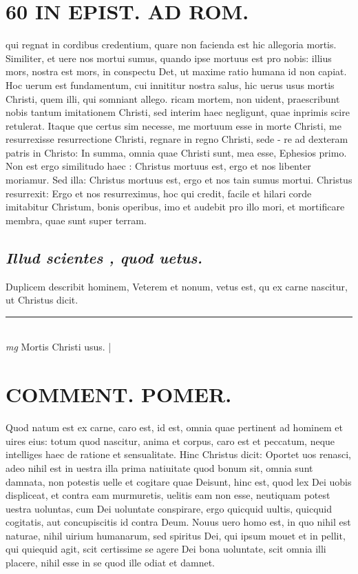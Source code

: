 \documentclass{article}
\begin{document}
\begin{pages}
\section*{60 IN EPIST. AD ROM.  }
\marginpar{[ p.]}\pstart qui regnat in cordibus credentium, quare non facienda est hic allegoria mortis. Similiter, et uere nos mortui sumus, quando ipse mortuus est pro nobis: illius mors, nostra est mors, in conspectu Det, ut maxime ratio humana id non capiat. Hoc uerum est fundamentum, cui innititur nostra salus, hic uerus usus mortis Christi, quem illi, qui somniant allego.  ricam mortem, non uident, praescribunt nobis tantum imitationem Christi, sed interim haec negligunt, quae inprimis scire retulerat. Itaque que certus sim necesse, me mortuum esse in morte Christi, me resurrexisse resurrectione Christi, regnare in regno Christi, sede - re ad dexteram patris in Christo: In summa, omnia quae Christi sunt, mea esse, Ephesios primo. Non est ergo similitudo haec : Christus mortuus est, ergo et nos libenter moriamur. Sed illa: Christus mortuus est, ergo et nos tain sumus mortui. Christus resurrexit: Ergo et nos resurreximus, hoc qui credit, facile et hilari corde imitabitur Christum, bonis operibus, imo et audebit pro illo mori, et mortificare membra, quae sunt super terram.   \pend
{}
{}
\subsection*{\textit{Illud scientes , quod uetus. }}\pstart Duplicem describit hominem, Veterem et nonum, vetus est, qu ex carne nascitur, ut Christus dicit.  \pend
\vspace{0.5cm}\noindent
\vspace{0.2cm}\rule{1cm}{0.2pt}\\ 
\hspace{0.2cm}\textit{mg}
\footnotesize Mortis Christi usus.  
\normalsize| 
\section*{COMMENT. POMER.  }\pstart Quod natum est ex carne, caro est, id est, omnia quae pertinent ad hominem et uires eius: totum quod nascitur, anima et corpus, caro est et peccatum, neque  intelliges haec de ratione et sensualitate. Hinc Christus dicit: Oportet uos renasci, adeo nihil est in uestra illa prima natiuitate quod bonum sit, omnia sunt damnata, non potestis uelle et cogitare quae Deisunt, hinc est, quod lex Dei uobis displiceat, et contra eam murmuretis, uelitis eam non esse, neutiquam potest uestra uoluntas, cum Dei uoluntate conspirare, ergo quicquid uultis, quicquid cogitatis, aut concupiscitis id contra Deum. Nouus uero homo est, in quo nihil est naturae, nihil uirium humanarum, sed spiritus Dei, qui ipsum mouet et in pellit, qui quiequid agit, scit certissime se agere Dei bona uoluntate, scit omnia illi placere, nihil esse in se quod ille odiat et damnet.   \pend
{}
{}

\end{pages}
\end{document}
